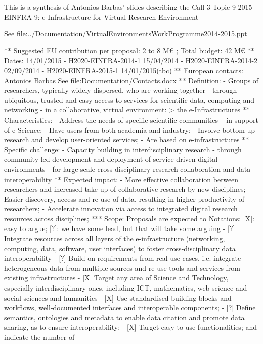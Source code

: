 This is a synthesis of Antonios Barbas' slides describing the Call 3
Topic 9-2015 EINFRA-9: e-Infrastructure for Virtual Research Environment

See file:../Documentation/VirtualEnvironmentsWorkProgramme2014-2015.ppt

** Suggested EU contribution per proposal: 2 to 8 M€ ; Total budget: 42 M€
** Dates: 14/01/2015
- H2020-EINFRA-2014-1 15/04/2014
- H2020-EINFRA-2014-2 02/09/2014
- H2020-EINFRA-2015-1 14/01/2015(tbc)
** European contacts: Antonios Barbas
   See file:Documentation/Contacts.docx
** Definition:
- Groups of researchers, typically widely dispersed, who are working
  together
- through ubiquitous, trusted and easy access to services for
  scientific data, computing and networking
- in a collaborative, virtual environment:
  > the e-Infrastructures
** Characteristics:
- Address the needs of specific scientific communities – in support of
  e-Science;
- Have users from both academia and industry;
- Involve bottom-up research and develop user-oriented services;
- Are based on e-infrastructures
** Specific challenge:
- Capacity building in interdisciplinary research
- through community-led development and deployment of service-driven
  digital environments
- for large-scale cross-disciplinary research collaboration and data
  interoperability
** Expected impact:
- More effective collaboration between researchers and increased
  take-up of collaborative research by new disciplines;
- Easier discovery, access and re-use of data, resulting in higher
  productivity of researchers;
- Accelerate innovation via access to integrated digital research
  resources across disciplines;
*** Scope: Proposals are expected to
Notations: [X]: easy to argue; [?]: we have some lead, but that will take some arguing
- [?] Integrate resources across all layers of the e-infrastructure
  (networking, computing, data, software, user interfaces) to foster
  cross-disciplinary data interoperability
- [?] Build on requirements from real use cases, i.e. integrate
  heterogeneous data from multiple sources and re-use tools and
  services from existing infrastructures
- [X] Target any area of Science and Technology, especially
  interdisciplinary ones, including ICT, mathematics, web science and
  social sciences and humanities
- [X] Use standardised building blocks and workflows, well-documented
  interfaces and interoperable components;
- [?] Define semantics, ontologies and metadata to enable data citation
  and promote data sharing, as to ensure interoperability;
- [X] Target easy-to-use functionalities; and indicate the number of

